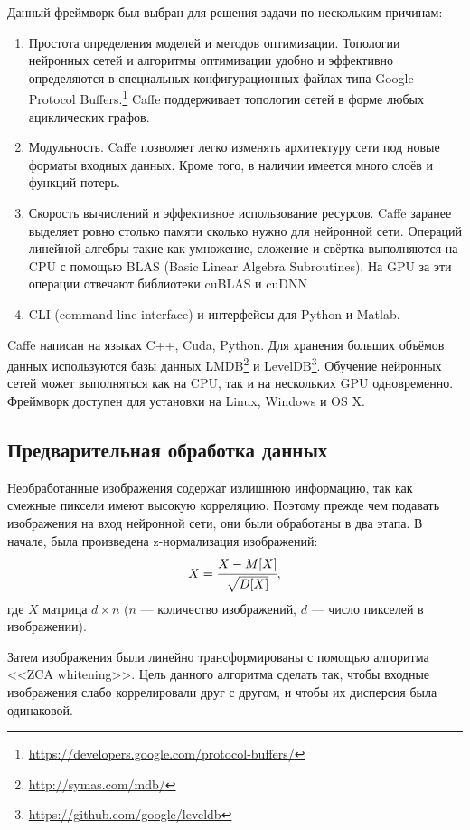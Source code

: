Данный фреймворк был выбран для решения задачи по нескольким причинам:
\begin{enumerate}
    \item Простота определения моделей и методов оптимизации. Топологии нейронных сетей и алгоритмы оптимизации удобно и 
    эффективно определяются в специальных конфигурационных файлах типа Google Protocol 
    Buffers.\footnote{\url{https://developers.google.com/protocol-buffers/}} Caffe поддерживает топологии сетей в форме любых 
    ациклических графов.
    \item Модульность. Caffe позволяет легко изменять архитектуру сети под новые форматы входных данных. Кроме того, в наличии 
    имеется много слоёв и функций потерь.
    \item Скорость вычислений и эффективное использование ресурсов. Caffe заранее выделяет ровно столько памяти сколько нужно для 
    нейронной сети. Операций линейной алгебры такие как умножение, сложение и свёртка выполняются на CPU с помощью BLAS (Basic 
    Linear Algebra Subroutines). На GPU за эти операции отвечают библиотеки cuBLAS и cuDNN 
    \cite{DBLP:journals/corr/ChetlurWVCTCS14}
    \item CLI (command line interface) и интерфейсы для Python и Matlab.
\end{enumerate}

Caffe написан на языках C++, Cuda, Python. Для хранения больших объёмов данных используются базы данных 
LMDB\footnote{\url{http://symas.com/mdb/}} и LevelDB\footnote{\url{https://github.com/google/leveldb}}. Обучение нейронных сетей 
может выполняться как на CPU, так и на нескольких GPU одновременно. Фреймворк доступен для установки на Linux, Windows и OS X.

\subsection{Предварительная обработка данных}
Необработанные изображения содержат излишнюю информацию, так как смежные пиксели имеют высокую корреляцию. Поэтому прежде чем 
подавать изображения на вход нейронной сети, они были обработаны в два этапа. В начале, была произведена z-нормализация 
изображений:
\[ X = \cfrac{X - M[X]}{\sqrt{D[X]}},\]
где $X$ матрица $d \times n$ ($n$ --- количество изображений, $d$ --- число пикселей в изображении).

Затем изображения были линейно трансформированы с помощью алгоритма <<ZCA whitening>>.
Цель данного алгоритма сделать так, чтобы входные изображения слабо коррелировали друг с другом, и чтобы их дисперсия была 
одинаковой.

